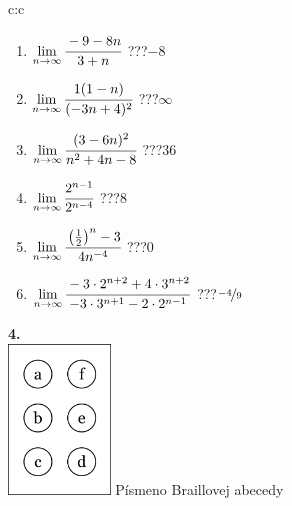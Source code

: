\documentclass[10pt]{report}
\begin{document}
\begin{tabular}{c:c}
\begin{minipage}[c][104.5mm][t]{0.5\linewidth}
\begin{center}
\begin{minipage}{0.79\linewidth}
\begin{center}
\begin{varwidth}{\linewidth}
\begin{enumerate}
\normalsize
\item $\lim\limits_{n\to\infty}\cfrac{-9-8n}{3+n}$\quad \dotfill\; ???\;\dotfill \quad $-8$
\item $\lim\limits_{n\to\infty}\cfrac{1(1-n)}{(-3n+4)^2}$\quad \dotfill\; ???\;\dotfill \quad $\infty$
\item $\lim\limits_{n\to\infty}\cfrac{(3-6n)^2}{n^2+4n-8}$\quad \dotfill\; ???\;\dotfill \quad $36$
\item $\lim\limits_{n\to\infty}\cfrac{2^{n-1}}{2^{n-4}}$\quad \dotfill\; ???\;\dotfill \quad $8$
\item $\lim\limits_{n\to\infty}\cfrac{\left(\frac{1}{2}\right)^n -3}{4n^{-4}}$\quad \dotfill\; ???\;\dotfill \quad $0$
\item $\lim\limits_{n\to\infty}\cfrac{-3\cdot 2^{n+2}+4\cdot 3^{n+2}}{-3\cdot 3^{n+1}-2\cdot 2^{n-1}}$\quad \dotfill\; ???\;\dotfill \quad $\nicefrac{-4}{9}$
\end{enumerate}
\end{varwidth}
\end{center}
\end{minipage}
\begin{minipage}{0.20\linewidth}
\begin{center}
{\Huge\bfseries 4.} \\[2mm]
\includegraphics[height=40mm]{../images/braille.png}
{\small Písmeno Braillovej abecedy}
\end{center}
\end{minipage}
\end{center}
\end{minipage}
%
\end{tabular}
\newpage
\thispagestyle{empty}
\end{document}
